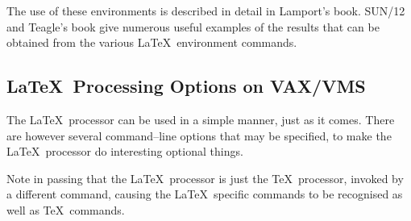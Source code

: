 The use of these environments is described in detail in 
Lamport's book. SUN/12 and Teagle's book 
give numerous useful examples of the results that can be obtained from the 
various \LaTeX\ environment commands. 

\subsection{\LaTeX\ Processing Options on VAX/VMS}
\label{se:latexopts}

The \LaTeX\ processor can be used in a simple manner, just as it comes. There
are however several command--line options that may be specified, to make the
\LaTeX\ processor do interesting optional things.

Note in passing that the \LaTeX\ processor is just the \TeX\
processor, invoked by a different command, causing the \LaTeX\ specific
commands to be recognised as well as \TeX\ commands.

